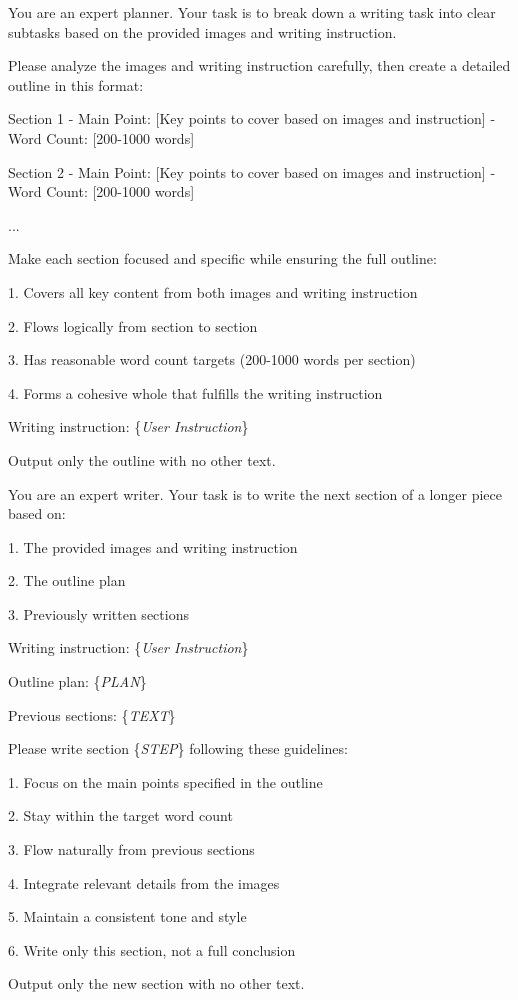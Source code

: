 \begin{tcolorbox}[size=title,opacityfill=0.1,breakable]
\noindent
You are an expert planner. Your task is to break down a writing task into clear subtasks based on the provided images and writing instruction.

Please analyze the images and writing instruction carefully, then create a detailed outline in this format:

Section 1 - Main Point: [Key points to cover based on images and instruction] - Word Count: [200-1000 words]

Section 2 - Main Point: [Key points to cover based on images and instruction] - Word Count: [200-1000 words]

...

Make each section focused and specific while ensuring the full outline:

1. Covers all key content from both images and writing instruction

2. Flows logically from section to section

3. Has reasonable word count targets (200-1000 words per section)

4. Forms a cohesive whole that fulfills the writing instruction

Writing instruction: \{\textit{User Instruction}\}

Output only the outline with no other text.
\end{tcolorbox}


\begin{tcolorbox}[size=title,opacityfill=0.1,breakable]
\noindent
You are an expert writer. Your task is to write the next section of a longer piece based on:

1. The provided images and writing instruction

2. The outline plan

3. Previously written sections

Writing instruction:  \{\textit{User Instruction}\}

Outline plan: \{\textit{PLAN}\}

Previous sections: \{\textit{TEXT}\}


Please write section  \{\textit{STEP}\} following these guidelines:

1. Focus on the main points specified in the outline

2. Stay within the target word count

3. Flow naturally from previous sections

4. Integrate relevant details from the images

5. Maintain a consistent tone and style

6. Write only this section, not a full conclusion

Output only the new section with no other text.
\end{tcolorbox}


